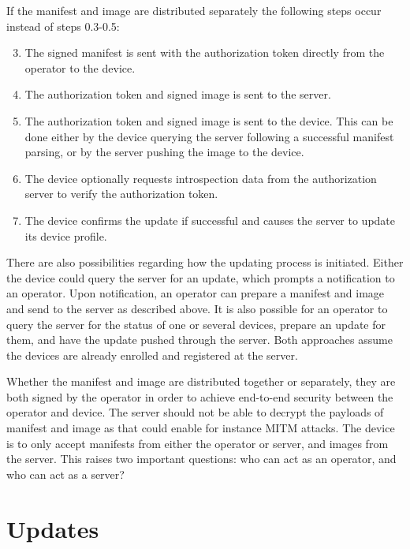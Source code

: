 \documentclass[0-thesis.tex]{subfiles}
\begin{document}
If the manifest and image are distributed separately the following steps occur instead of
steps 0.3-0.5:

\begin{enumerate}[label=1.\arabic*]
    \setcounter{enumi}{2}
    \item The signed manifest is sent with the authorization token directly from the
            operator to the device.
    \item The authorization token and signed image is sent to the server.
    \item The authorization token and signed image is sent to the device. This can be done
            either by the device querying the server following a successful manifest parsing,
            or by the server pushing the image to the device.
    \item The device optionally requests introspection data from the authorization server
            to verify the authorization token.
    \item The device confirms the update if successful and causes the server to update
            its device profile.
\end{enumerate}

There are also possibilities regarding how the updating process is initiated. Either the
device could query the server for an update, which prompts a notification to an operator.
Upon notification, an operator can prepare a manifest and image and send to the server as
described above. It is also possible for an operator to query the server for the status of
one or several devices, prepare an update for them, and have the update pushed through the
server. Both approaches assume the devices are already enrolled and registered at the
server.

Whether the manifest and image are distributed together or separately, they are both
signed by the operator in order to achieve end-to-end security between the operator and
device. The server should not be able to decrypt the payloads of manifest and image as
that could enable for instance MITM attacks. The device is to only accept manifests from
either the operator or server, and images from the server. This raises two important
questions: who can act as an operator, and who can act as a server?

\section{Updates}
\label{sec:updates}
\end{document}
